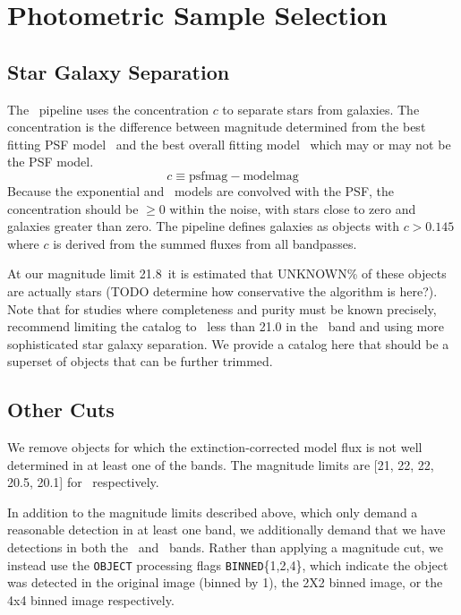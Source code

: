 \documentclass[preprint]{aastex}
\newcommand{\rmax}{21.8}
\newcommand{\contam}{{\color{red} UNKNOWN}}
\begin{document}
\section{Photometric Sample Selection} \label{sec:select}

\subsection{Star Galaxy Separation}

The \photo\ pipeline uses the concentration $c$ to separate stars from
galaxies.  The concentration is the difference between magnitude determined
from the best fitting PSF model \psfmag\ and the best overall fitting model 
\modelmag\ which may or may not be the PSF model.
\begin{equation}
c \equiv \textrm{psfmag} - \textrm{modelmag}
\end{equation}
Because the exponential and \devauc\ models are convolved with the PSF, the
concentration should be $\ge 0$ within the noise, with stars close to zero and
galaxies greater than zero.  The pipeline defines galaxies as objects with $c >
0.145$ \citep{dr7classify} where $c$ is derived from the summed fluxes from all
bandpasses.  

At our magnitude limit \rmax\ it is estimated that \contam\% of these objects
are actually stars (TODO determine how conservative the algorithm is here?).
Note that for studies where completeness and purity must be known precisely,
\citet{ScrantonMag05} recommend limiting the catalog to \cmodelmag\ less than
21.0 in the \rmag\ band and using more sophisticated star galaxy separation. We
provide a catalog here that should be a superset of objects that can be further
trimmed.

\subsection{Other Cuts}

We remove objects for which the extinction-corrected model flux is not well
determined in at least one of the bands.  The magnitude limits are [21, 22, 22,
20.5, 20.1] for \allmag\ respectively.

In addition to the magnitude limits described above, which only demand a
reasonable detection in at least one band, we additionally demand that we have
detections in both the \rmag\ and \imag\ bands.  Rather than applying a
magnitude cut, we instead use the \texttt{OBJECT} processing flags
\texttt{BINNED}\{1,2,4\}, which indicate the object was detected in the original
image (binned by 1), the 2X2 binned image, or the 4x4 binned image respectively.
\end{document}
